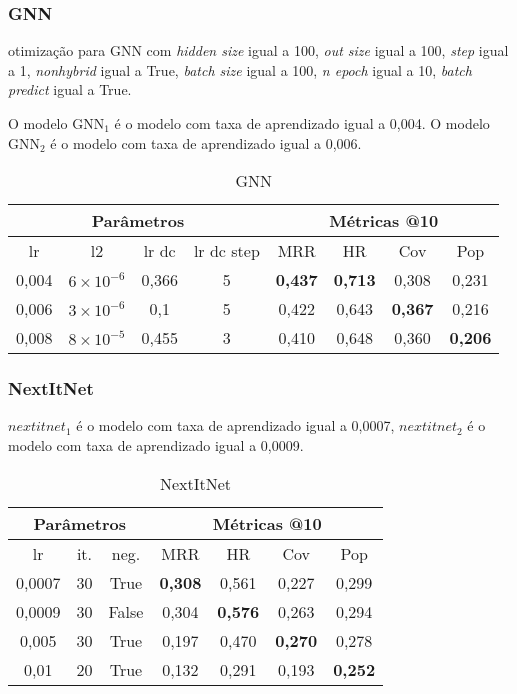\subsubsection{GNN}
otimização para GNN com \textit{hidden size} igual a 100, \textit{out size} igual a 100,
\textit{step} igual a 1, \textit{nonhybrid} igual a True, \textit{batch size} igual a 100,
\textit{n epoch} igual a 10, \textit{batch predict} igual a True.

O modelo $\text{GNN}_{1}$ é o modelo com taxa de aprendizado igual a 0,004.
O modelo $\text{GNN}_{2}$ é o modelo com taxa de aprendizado igual a 0,006.
\begin{table}[htbp]
  \centering
  \begin{tabular}{|c|c|c|c|c|c|c|c|}
    \hline
      \multicolumn{4}{|c|}{Parâmetros} & \multicolumn{4}{c|}{Métricas @10} \\
      \hline
      lr & l2 & lr dc & lr dc step & MRR & HR & Cov & Pop \\
      \hline
      0,004 & $6 \times 10^{-6}$ & 0,366 & 5 & \textbf{0,437} & \textbf{0,713} & 0,308 & 0,231 \\
      \hline
      0,006 & $3 \times 10^{-6}$ & 0,1 & 5 & 0,422 & 0,643 & \textbf{0,367} & 0,216 \\
      \hline
      0,008 & $8 \times 10^{-5}$ & 0,455 & 3 & 0,410 & 0,648 & 0,360 & \textbf{0,206} \\
      \hline
      \end{tabular}
      \caption{GNN}
\end{table}

\subsubsection{NextItNet}
$nextitnet_1$ é o modelo com taxa de aprendizado igual a 0,0007, $nextitnet_2$ é
o modelo com taxa de aprendizado igual a 0,0009.
\begin{table}[htbp]
  \centering
  \begin{tabular}{|c|c|c|c|c|c|c|}
    \hline
      \multicolumn{3}{|c|}{Parâmetros} & \multicolumn{4}{c|}{Métricas @10} \\
      \hline
      lr & it. & neg. & MRR & HR & Cov & Pop \\
      \hline
      0,0007 & 30 & True & \textbf{0,308} & 0,561 & 0,227 & 0,299 \\
      \hline
      0,0009 & 30 & False & 0,304 & \textbf{0,576} & 0,263 & 0,294 \\
      \hline
      0,005 & 30 & True & 0,197 & 0,470 & \textbf{0,270} & 0,278 \\
      \hline
      0,01 & 20 & True & 0,132 & 0,291 & 0,193 & \textbf{0,252} \\
      \hline
    \end{tabular}
    \caption{NextItNet}
\end{table}

